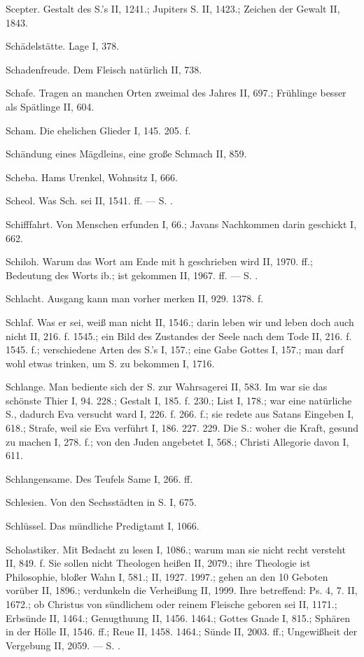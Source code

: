 Scepter. Gestalt des S.’s II, 1241.; Jupiters S. II, 1423.; Zeichen der Gewalt II, 1843.

Schädelstätte. Lage I, 378.

Schadenfreude. Dem Fleisch natürlich II, 738.

Schafe. Tragen an manchen Orten zweimal des Jahres II, 697.; Frühlinge besser als Spätlinge II, 604.

Scham. Die ehelichen Glieder I, 145. 205. f.

Schändung eines Mägdleins, eine große Schmach II, 859.

Scheba. Hams Urenkel, Wohnsitz I, 666.

Scheol. Was Sch. sei II, 1541. ff. — S. .

Schifffahrt. Von Menschen erfunden I, 66.; Javans Nachkommen darin geschickt I, 662.

Schiloh. Warum das Wort am Ende mit h geschrieben wird II, 1970. ff.; Bedeutung des Worts ib.; ist gekommen II, 1967. ff. — S. .

Schlacht. Ausgang kann man vorher merken II, 929. 1378. f.

Schlaf. Was er sei, weiß man nicht II, 1546.; darin leben wir und leben doch auch nicht II, 216. f. 1545.; ein Bild des Zustandes der Seele nach dem Tode II, 216. f. 1545. f.; verschiedene Arten des S.’s I, 157.; eine Gabe Gottes I, 157.; man darf wohl etwas trinken, um S. zu bekommen I, 1716.

Schlange. Man bediente sich der S. zur Wahrsagerei II, 583. Im  war sie das schönste Thier I, 94. 228.; Gestalt I, 185. f. 230.; List I, 178.; war eine natürliche S., dadurch Eva versucht ward I, 226. f. 266. f.; sie redete aus Satans Eingeben I, 618.; Strafe, weil sie Eva verführt I, 186. 227. 229. Die  S.: woher die Kraft, gesund zu machen I, 278. f.; von den Juden angebetet I, 568.; Christi Allegorie davon I, 611.

Schlangensame. Des Teufels Same I, 266. ff.

Schlesien. Von den Sechsstädten in S. I, 675.

Schlüssel. Das mündliche Predigtamt I, 1066.

Scholastiker. Mit Bedacht zu lesen I, 1086.; warum man sie nicht recht versteht II, 849. f. Sie sollen nicht Theologen heißen II, 2079.; ihre Theologie ist Philosophie, bloßer Wahn I, 581.; II, 1927. 1997.; gehen an den 10 Geboten vorüber II, 1896.; verdunkeln die Verheißung II, 1999. Ihre  betreffend: Ps. 4, 7. II, 1672.; ob Christus von sündlichem oder reinem Fleische geboren sei II, 1171.; Erbsünde II, 1464.; Genugthuung II, 1456. 1464.; Gottes Gnade I, 815.; Sphären in der Hölle II, 1546. ff.; Reue II, 1458. 1464.; Sünde II, 2003. ff.; Ungewißheit der Vergebung II, 2059. — S. .

